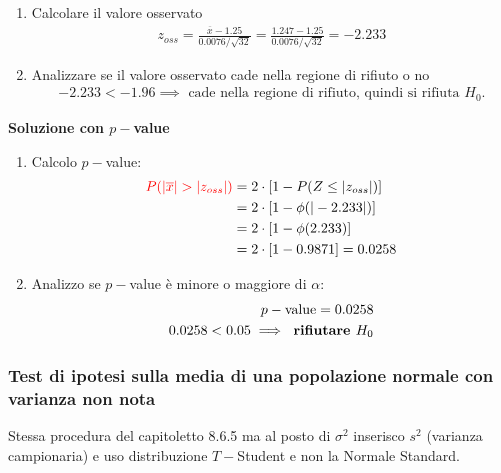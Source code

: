 \documentclass{article}  %
\theoremstyle{definition}
\begin{document}
\begin{esercizio}
\begin{enumerate}
\begin{align*}
		      \end{align*}
		\item Calcolare il valore osservato
		      \begin{align*}
			      z_{oss} = \frac{\overline{x}-1.25}{0.0076/\sqrt{32}} = \frac{1.247-1.25}{0.0076/\sqrt{32}} = -2.233
		      \end{align*}
		\item Analizzare se il valore osservato cade nella regione di rifiuto o no
		      \begin{align*}
			      -2.233 < -1.96 \implies \text{ cade nella regione di rifiuto, quindi si rifiuta } H_0.
		      \end{align*}
	\end{enumerate}
	\begin{center}
		\textbf{Soluzione con $p-$value}
	\end{center}
	\begin{enumerate}
		\item Calcolo $p-$value:
		      \begin{align*}
			      \textcolor{red}{P(|\overline{x}| > |z_ {oss}|)}
			       & = 2 \cdot \left[1- P(Z \leq |z_ {oss}|)\right] \\
			       & = 2 \cdot [1- \phi(|-2.233|)]                  \\
			       & = 2 \cdot [1- \phi(2.233)]                     \\
			       & = 2 \cdot [1- 0.9871] = 0.0258
		      \end{align*}
		\item Analizzo se $p-$value è minore o maggiore di $\alpha$:
		      \begin{align*}
			      p-\text{value} = 0.0258 \\
			      0.0258 < 0.05 \implies \text{ \textbf{rifiutare $H_0$}}
		      \end{align*}
	\end{enumerate}
\end{esercizio}
\newpage

\subsubsection{Test di ipotesi sulla media di una popolazione normale con varianza non nota}
Stessa procedura del capitoletto 8.6.5 ma al posto di $\sigma^2$ inserisco $s^2$ (varianza campionaria)
e uso distribuzione $T-$Student e non la Normale Standard.

\begin{esercizio}

\end{esercizio}
\end{document}
